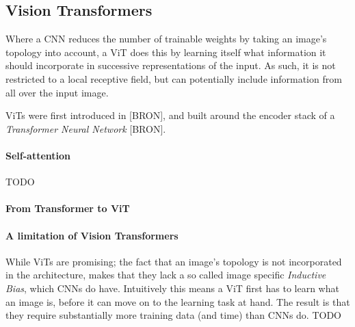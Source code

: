 

\subsection{Vision Transformers}
Where a CNN reduces the number of trainable weights by taking an image's topology into account, a ViT does this by learning itself what information it should incorporate in successive representations of the input. As such, it is not restricted to a local receptive field, but can potentially include information from all over the input image.

ViTs were first introduced in [BRON], and built around the encoder stack of a \textit{Transformer Neural Network} [BRON].

\paragraph{Self-attention}
TODO

\paragraph{From Transformer to ViT}


\paragraph{A limitation of Vision Transformers}
While ViTs are promising; the fact that an image's topology is not incorporated in the architecture, makes that they lack a so called image specific \textit{Inductive Bias}, which CNNs do have. Intuitively this means a ViT first has to learn what an image is, before it can move on to the learning task at hand. The result is that they require substantially more training data (and time) than CNNs do. 
TODO

